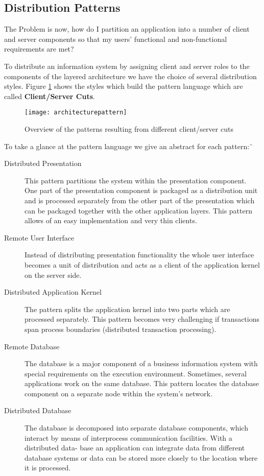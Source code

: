 \subsection{Distribution Patterns}
The Problem is now, how do I partition an application into a number of client and server components so that my users' functional and non-functional requirements are met?

To distribute an information system by assigning client and server roles to the components of the layered architecture we have the choice of several distribution styles. Figure \ref{fig:patternlanguage} shows the styles which build the pattern language which are called \textbf{Client/Server Cuts}.

\begin{figure}[H]
  \center
  \texttt{[image: architecturepattern]}
  \caption{Overview of the patterns resulting from different client/server cuts}
  \label{fig:patternlanguage}
\end{figure}


To take a glance at the pattern language we give an abstract for each pattern:¨
\begin{description}
  \item [Distributed Presentation] This pattern partitions the system within the presentation component. One part of the presentation component is packaged as a distribution unit and is processed separately from the other part of the presentation which can be packaged together with the other application layers. This pattern allows of an easy implementation and very thin clients.
  \item [Remote User Interface] Instead of distributing presentation functionality the whole user interface becomes a unit of distribution and acts as a client of the application kernel on the server side.
  \item [Distributed Application Kernel] The pattern splits the application kernel into two parts which are processed separately. This pattern becomes very challenging if transactions span process boundaries (distributed transaction processing).
  \item [Remote Database]  The database is a major component of a business information system with special requirements on the execution environment. Sometimes, several applications work on the same database. This pattern locates the database component on a separate node within the system’s network.
  \item [Distributed Database] The database is decomposed into separate database components, which interact by means of interprocess communication facilities. With a distributed data- base an application can integrate data from different database systems or data can be stored more closely to the location where it is processed.
\end{description}

